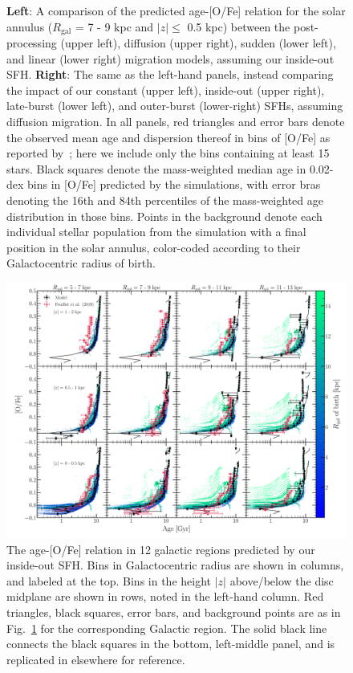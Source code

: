 \documentclass[fleqn, usenatbib]{mnras}
\begin{document}
\begin{figure}
\caption{
\textbf{Left}: A comparison of the predicted age-[O/Fe] relation for the 
solar annulus ($R_\text{gal}$ = 7 - 9 kpc and $\left|z\right|\leq$ 0.5 kpc) 
between the post-processing (upper left), diffusion (upper right), sudden 
(lower left), and linear (lower right) migration models, assuming our 
inside-out SFH. 
\textbf{Right}: The same as the left-hand panels, instead comparing the impact 
of our constant (upper left), inside-out (upper right), late-burst (lower 
left), and outer-burst (lower-right) SFHs, assuming diffusion migration. 
In all panels, red triangles and error bars denote the observed mean age and 
dispersion thereof in bins of [O/Fe] as reported by~\citet{Feuillet2019}; here 
we include only the bins containing at least 15 stars. Black squares denote 
the mass-weighted median age in 0.02-dex bins in [O/Fe] predicted by the 
simulations, with error bras denoting the 16th and 84th percentiles of the 
mass-weighted age distribution in those bins. Points in the background denote 
each individual stellar population from the simulation with a final position 
in the solar annulus, color-coded according to their Galactocentric radius of 
birth. 
} 
\label{fig:age_alpha} 
\end{figure} 

\begin{figure} 
\centering 
\includegraphics[scale = 0.32]{age_alpha_regions.pdf} 
\caption{The age-[O/Fe] relation in 12 galactic regions predicted by 
our inside-out SFH. Bins in Galactocentric radius are shown in columns, 
and labeled at the top. Bins in the height $\left|z\right|$ above/below the 
disc midplane are shown in rows, noted in the left-hand column. Red triangles, 
black squares, error bars, and background points are as in 
Fig.~\ref{fig:age_alpha} for the corresponding Galactic 
region. The solid black line connects the black squares in the bottom, 
left-middle panel, and is replicated in elsewhere for reference. 
} 
\label{fig:age_alpha_regions} 
\end{figure} 
\end{document}
